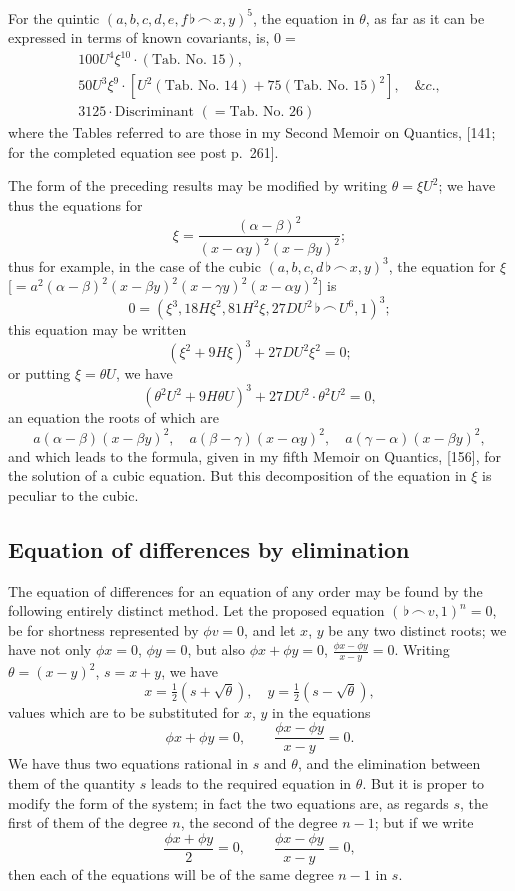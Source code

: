 \documentclass[11pt,a4paper]{article}
\theoremstyle{definition}
\begin{document}
For the quintic $(a,b,c,d,e,f\,\flat\,\frown\, x,y)^5$, the equation in $\theta$, as far as it can be expressed in terms of known covariants, is, $0=$
\begin{multline*}
100U^4\xi^{10}\cdot(\text{Tab.\ No.\ 15}),\\
50U^3\xi^9\cdot[U^2(\text{Tab.\ No.\ 14})+75(\text{Tab.\ No.\ 15})^2],\quad\&c.,\\
3125\cdot\text{Discriminant }(=\text{Tab.\ No.\ 26})
\end{multline*}
where the Tables referred to are those in my Second Memoir on Quantics, [141; for the completed equation see post p.~261].

The form of the preceding results may be modified by writing $\theta=\xi U^2$; we have thus the equations for
\[
\xi=\frac{(\alpha-\beta)^2}{(x-\alpha y)^2(x-\beta y)^2};
\]
thus for example, in the case of the cubic $(a,b,c,d\,\flat\,\frown\, x,y)^3$, the equation for $\xi$ [$=a^2(\alpha-\beta)^2(x-\beta y)^2(x-\gamma y)^2(x-\alpha y)^2$] is
\[
0=(\xi^3,18H\xi^2,81H^2\xi,27DU^2\,\flat\,\frown\, U^6,1)^3;
\]
this equation may be written
\[
(\xi^2+9H\xi)^3+27DU^2\xi^2=0;
\]
or putting $\xi=\theta U$, we have
\[
(\theta^2U^2+9H\theta U)^3+27DU^2\cdot\theta^2U^2=0,
\]
an equation the roots of which are
\[
a(\alpha-\beta)(x-\beta y)^2,\quad a(\beta-\gamma)(x-\alpha y)^2,\quad a(\gamma-\alpha)(x-\beta y)^2,
\]
and which leads to the formula, given in my fifth Memoir on Quantics, [156], for the solution of a cubic equation. But this decomposition of the equation in $\xi$ is peculiar to the cubic.

\subsection*{Equation of differences by elimination}

The equation of differences for an equation of any order may be found by the following entirely distinct method. Let the proposed equation $(\,\flat\,\frown\, v,1)^n=0$, be for shortness represented by $\phi v=0$, and let $x$, $y$ be any two distinct roots; we have not only $\phi x=0$, $\phi y=0$, but also $\phi x+\phi y=0$, $\frac{\phi x-\phi y}{x-y}=0$. Writing $\theta=(x-y)^2$, $s=x+y$, we have
\[
x=\tfrac{1}{2}(s+\sqrt{\theta}),\quad y=\tfrac{1}{2}(s-\sqrt{\theta}),
\]
values which are to be substituted for $x$, $y$ in the equations
\[
\phi x+\phi y=0,\qquad \frac{\phi x-\phi y}{x-y}=0.
\]
We have thus two equations rational in $s$ and $\theta$, and the elimination between them of the quantity $s$ leads to the required equation in $\theta$. But it is proper to modify the form of the system; in fact the two equations are, as regards $s$, the first of them of the degree $n$, the second of the degree $n-1$; but if we write
\[
\frac{\phi x+\phi y}{2}=0,\qquad \frac{\phi x-\phi y}{x-y}=0,
\]
then each of the equations will be of the same degree $n-1$ in $s$.
\end{document}
